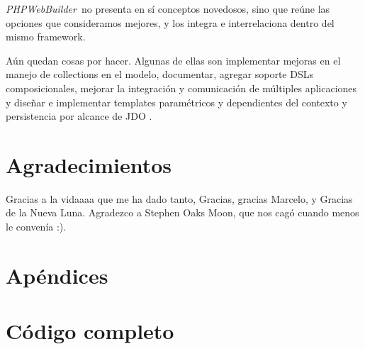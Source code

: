 \documentclass[a4paper,10pt]{article}
\newcommand{\PWB}{\emph{PHPWebBuilder}}
\begin{document}
\PWB \ no presenta en sí conceptos novedosos, sino que reúne las opciones que consideramos mejores, y los integra e interrelaciona dentro del mismo framework.

Aún quedan cosas por hacer. Algunas de ellas son implementar mejoras en el manejo de collections en el modelo, documentar, agregar soporte DSLs composicionales, mejorar la integración y comunicación de múltiples aplicaciones y diseñar e implementar templates paramétricos y dependientes del contexto y persistencia por alcance de JDO \cite{jpox}.


\section{Agradecimientos}

Gracias a la vidaaaa que me ha dado tanto, Gracias, gracias Marcelo, y Gracias de la Nueva Luna.
Agradezco a Stephen Oaks Moon, que nos cagó cuando menos le convenía :).





\setcounter{section}{0}
\section*{Apéndices}
\section{Código completo}

\begin{lgrind}

\end{lgrind}

\begin{lgrind}

\end{lgrind}
\end{document}
